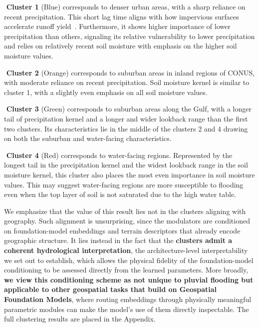 \noindent
{}\,\,\textbf{Cluster 1} (Blue) corresponds to denser urban areas, with a sharp reliance on recent precipitation. This short lag time aligns with how impervious surfaces accelerate runoff yield~\cite{liao_fast_2023}. Furthermore, it shows higher importance of lower precipitation than others, signaling its relative vulnerability to lower precipitation and relies on relatively recent soil moisture with emphasis on the higher soil moisture values.

\noindent
{}\,\,\textbf{Cluster 2} (Orange) corresponds to suburban areas in inland regions of CONUS, with moderate reliance on recent precipitation. Soil moisture kernel is similar to cluster 1, with a slightly even emphasis on all soil moisture values.

\noindent
{}\,\,\textbf{Cluster 3} (Green) corresponds to suburban areas along the Gulf, with a longer tail of precipitation kernel and a longer and wider lookback range than the first two clusters. Its characteristics lie in the middle of the clusters 2 and 4 drawing on both the suburban and water-facing characteristics.

\noindent
{}\,\,\textbf{Cluster 4} (Red) corresponds to water-facing regions. Represented by the longest tail in the precipitation kernel and the widest lookback range in the soil moisture kernel, this cluster also places the most even importance in soil moisture values. This may suggest water-facing regions are more susceptible to flooding even when the top layer of soil is not saturated due to the high water table.

We emphasize that the value of this result lies not in the clusters aligning with geography.
%
Such alignment is unsurprising, since the modulators are conditioned on foundation-model embeddings and terrain descriptors that already encode geographic structure.
%
It lies instead in the fact that the \textbf{clusters admit a coherent hydrological interpretation}, the architecture-level interpretability we set out to establish, which allows the physical fidelity of the foundation-model conditioning to be assessed directly from the learned parameters.
%
More broadly, \textbf{we view this conditioning scheme as not unique to pluvial flooding but applicable to other geospatial tasks that build on Geospatial Foundation Models}, where routing embeddings through physically meaningful parametric modules can make the model's use of them directly inspectable.
%
The full clustering results are placed in the Appendix.
%

